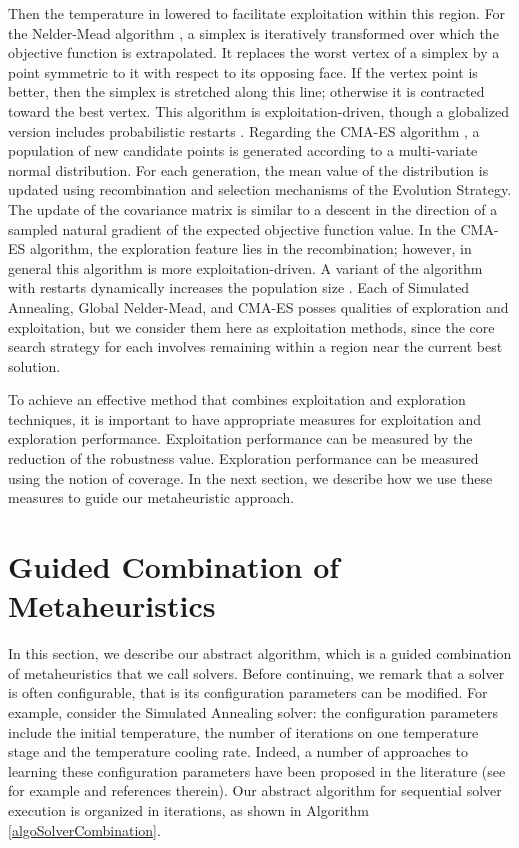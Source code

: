 Then the temperature in lowered to facilitate exploitation within this region. For the Nelder-Mead algorithm \cite{NelderMead65}, a simplex is iteratively transformed over which the objective function is extrapolated. It replaces the worst vertex of a simplex by a point symmetric to it with respect to its opposing face. If the vertex point is better, then the simplex is stretched along this line; otherwise it is contracted toward the best vertex. This algorithm is exploitation-driven, though a globalized version includes probabilistic restarts \cite{CHANG2012684}. Regarding the CMA-ES algorithm \cite{hansen2006eda}, a population of new candidate points is generated according to a multi-variate normal distribution. For each generation, the mean value of the distribution is updated using recombination and selection mechanisms of the Evolution Strategy. The update of the covariance matrix is similar to a descent in the direction of a sampled natural gradient of the expected objective function value. In the CMA-ES algorithm, the exploration feature lies in the recombination; however, in general this algorithm is more exploitation-driven. A variant of the algorithm with restarts dynamically increases the population size \cite{hansen2006eda}. Each of Simulated Annealing, Global Nelder-Mead, and CMA-ES posses qualities of exploration and exploitation, but we consider them here as exploitation methods, since the core search strategy for each involves remaining within a region near the current best solution.

To achieve an effective method that combines exploitation and exploration techniques, it is important to have appropriate measures for exploitation and exploration performance. Exploitation performance can be measured by the reduction of the robustness value. Exploration performance can be measured using the notion of coverage. In the next section, we describe how we use these measures to guide our metaheuristic approach.

\section{Guided Combination of Metaheuristics} \label{sec:combination}
In this section, we describe our abstract algorithm, which is a guided combination of metaheuristics that we call solvers. Before continuing, we remark that a solver is often configurable, that is its configuration parameters can be modified. For example, consider the Simulated Annealing solver: the configuration parameters include the initial temperature, the number of iterations on one temperature stage and the temperature cooling rate. Indeed, a number of approaches to learning these configuration parameters have been proposed in the literature (see for example \cite{HutHooLey11-smac} and references therein). %
Our abstract algorithm for sequential solver execution is organized in iterations, as shown in Algorithm \ref{algoSolverCombination}. 

